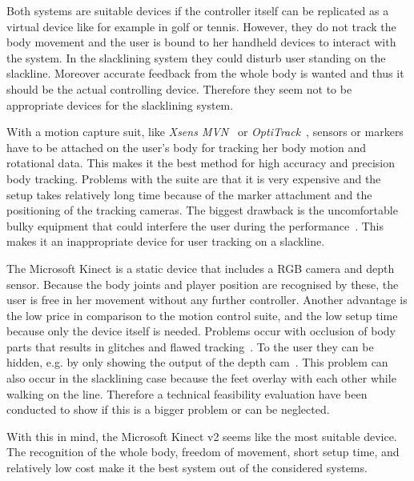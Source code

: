 Both systems are suitable devices if the controller itself can be replicated as a virtual device like for example in golf or tennis. However, they do not track the body movement and the user is bound to her handheld devices to interact with the system. In the slacklining system they could disturb user standing on the slackline. Moreover accurate feedback from the whole body is wanted and thus it should be the actual controlling device. Therefore they seem not to be appropriate devices for the slacklining system.

With a motion capture suit, like \textit{Xsens MVN}~\cite{XsensMvn} or \textit{OptiTrack}~\cite{OptiTrack}, sensors or markers have to be attached on the user’s body for tracking her body motion and rotational data. This makes it the best method for high accuracy and precision body tracking. Problems with the suite are that it is very expensive and the setup takes relatively long time because of the marker attachment and the positioning of the tracking cameras. The biggest drawback is the uncomfortable bulky equipment that could interfere the user during the performance~\cite{Bogdanovych2015-ci, Chang2012-hz, Nusman2006-rf}. This makes it an inappropriate device for user tracking on a slackline.

The Microsoft Kinect is a static device that includes a RGB camera and depth sensor. Because the body joints and player position are recognised by these, the user is free in her movement without any further controller. Another advantage is the low price in comparison to the motion control suite, and the low setup time because only the device itself is needed. Problems occur with occlusion of body parts that results in glitches and flawed tracking~\cite{Kajastila2014-ug, Tang2015-wt}. To the user they can be hidden, e.g. by only showing the output of the depth cam~\cite{Holsti2013-kn}. This problem can also occur in the slacklining case because the feet overlay with each other while walking on the line. Therefore a technical feasibility evaluation have been conducted to show if this is a bigger problem or can be neglected.

With this in mind, the Microsoft Kinect v2 seems like the most suitable device. The recognition of the whole body, freedom of movement, short setup time, and relatively low cost make it the best system out of the considered systems.

